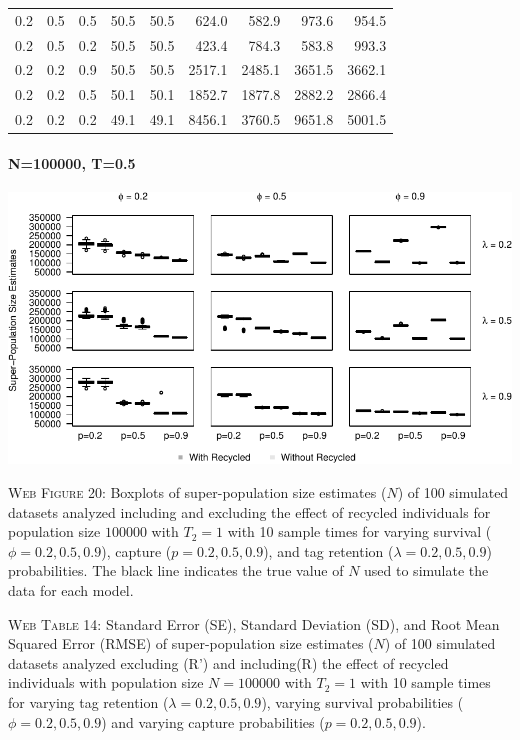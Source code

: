 \documentclass[]{article}
\let\oldparagraph\paragraph
\renewcommand{\paragraph}[1]{\oldparagraph{#1}\mbox{}}
\begin{document}
\begin{table}[ht]
{\begin{tabular}{rrrrrrrrr}
  0.2 & 0.5 & 0.5 & 50.5 & 50.5 & 624.0 & 582.9 & 973.6 & 954.5 \\ 
  0.2 & 0.5 & 0.2 & 50.5 & 50.5 & 423.4 & 784.3 & 583.8 & 993.3 \\ 
  0.2 & 0.2 & 0.9 & 50.5 & 50.5 & 2517.1 & 2485.1 & 3651.5 & 3662.1 \\ 
  0.2 & 0.2 & 0.5 & 50.1 & 50.1 & 1852.7 & 1877.8 & 2882.2 & 2866.4 \\ 
  0.2 & 0.2 & 0.2 & 49.1 & 49.1 & 8456.1 & 3760.5 & 9651.8 & 5001.5 \\ 
   \hline
\end{tabular}
}
\endgroup
\end{table}

\newpage

\paragraph{N=100000, T=0.5}\label{n100000-t0.5-3}

\includegraphics{Appendix_BW_files/figure-latex/figure20_superN_GJSTL2-1.pdf}

\textsc{Web Figure 20:} Boxplots of super-population size estimates
(\(N\)) of 100 simulated datasets analyzed including and excluding the effect
of recycled individuals for population size \(100000\) with \(T_2=1\)
with 10 sample times for varying survival (\(\phi=0.2,0.5,0.9\)),
capture (\(p=0.2,0.5,0.9\)), and tag retention (\(\lambda=0.2,0.5,0.9\))
probabilities. The black line indicates the true value of \(N\) used to
simulate the data for each model.

\textsc{Web Table 14:} Standard Error (SE), Standard Deviation (SD), and
Root Mean Squared Error (RMSE) of super-population size estimates
(\(N\)) of 100 simulated datasets analyzed excluding (R') and including(R) the
effect of recycled individuals with population size \(N=100000\) with
\(T_2=1\) with 10 sample times for varying tag retention
(\(\lambda=0.2,0.5,0.9\)), varying survival probabilities
(\(\phi=0.2,0.5,0.9\)) and varying capture probabilities
(\(p=0.2,0.5,0.9\)).
\end{document}
